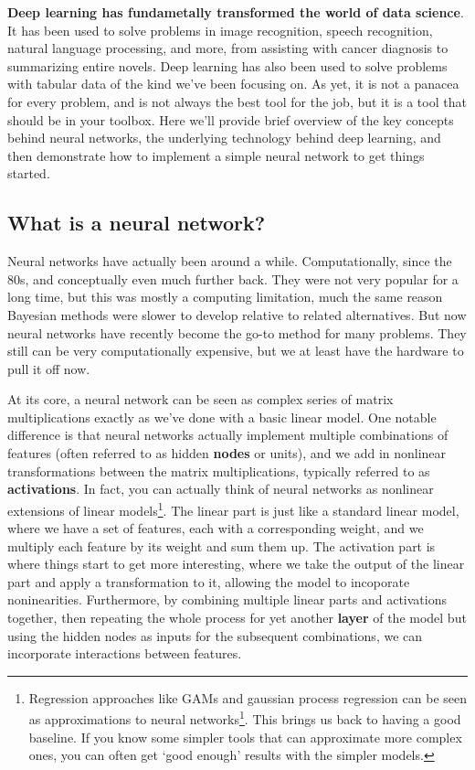 \documentclass[
  letterpaper,
]{krantz}
\DeclareRobustCommand{\href}[2]{#2\footnote{\url{#1}}}
\begin{document}
\textbf{Deep learning has fundametally transformed the world of data
science}. It has been used to solve problems in image recognition,
speech recognition, natural language processing, and more, from
assisting with cancer diagnosis to summarizing entire novels. Deep
learning has also been used to solve problems with tabular data of the
kind we've been focusing on. As yet, it is not a panacea for every
problem, and is not always the best tool for the job, but it is a tool
that should be in your toolbox. Here we'll provide brief overview of the
key concepts behind neural networks, the underlying technology behind
deep learning, and then demonstrate how to implement a simple neural
network to get things started.

\subsection{What is a neural network?}\label{what-is-a-neural-network}

Neural networks have actually been around a while. Computationally,
since the 80s, and conceptually even much further back. They were not
very popular for a long time, but this was mostly a computing
limitation, much the same reason Bayesian methods were slower to develop
relative to related alternatives. But now neural networks have recently
become the go-to method for many problems. They still can be very
computationally expensive, but we at least have the hardware to pull it
off now.

At its core, a neural network can be seen as complex series of matrix
multiplications exactly as we've done with a basic linear model. One
notable difference is that neural networks actually implement multiple
combinations of features (often referred to as hidden \textbf{nodes} or
units), and we add in nonlinear transformations between the matrix
multiplications, typically referred to as \textbf{activations}. In fact,
you can actually think of neural networks as nonlinear extensions of
linear models\footnote{Regression approaches like GAMs and gaussian
  process regression can be seen as
  \href{https://arxiv.org/abs/1711.00165}{approximations to neural
  networks}. This brings us back to having a good baseline. If you know
  some simpler tools that can approximate more complex ones, you can
  often get `good enough' results with the simpler models.}. The linear
part is just like a standard linear model, where we have a set of
features, each with a corresponding weight, and we multiply each feature
by its weight and sum them up. The activation part is where things start
to get more interesting, where we take the output of the linear part and
apply a transformation to it, allowing the model to incoporate
noninearities. Furthermore, by combining multiple linear parts and
activations together, then repeating the whole process for yet another
\textbf{layer} of the model but using the hidden nodes as inputs for the
subsequent combinations, we can incorporate interactions between
features.
\end{document}
